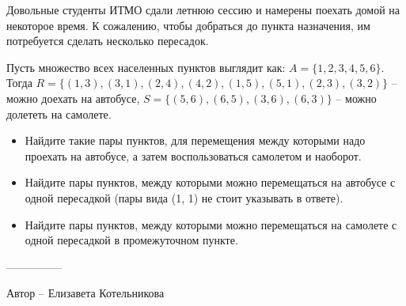 \question
Довольные студенты ИТМО сдали летнюю сессию и намерены поехать домой на некоторое время. К сожалению, чтобы добраться до пункта назначения, им потребуется сделать несколько пересадок.

Пусть множество всех населенных пунктов выглядит как: $A = \{1, 2, 3, 4, 5, 6\}$.
\\
Тогда $R = \{(1, 3), (3, 1), (2, 4), (4, 2), (1, 5), (5, 1), (2, 3), (3, 2)\}$ -- можно доехать на автобусе, $S = \{(5, 6), (6, 5), (3, 6), (6, 3)\}$ -- можно долететь на самолете.

\begin{itemize}
    \item Найдите такие пары пунктов, для перемещения между которыми надо проехать на автобусе, а затем воспользоваться самолетом и наоборот.
    \item Найдите пары пунктов, между которыми можно перемещаться на автобусе с одной пересадкой (пары вида (1, 1) не стоит указывать в ответе).
    \item Найдите пары пунктов, между которыми можно перемещаться на самолете с одной пересадкой в промежуточном пункте.
\end{itemize}

---------------

Автор -- Елизавета Котельникова